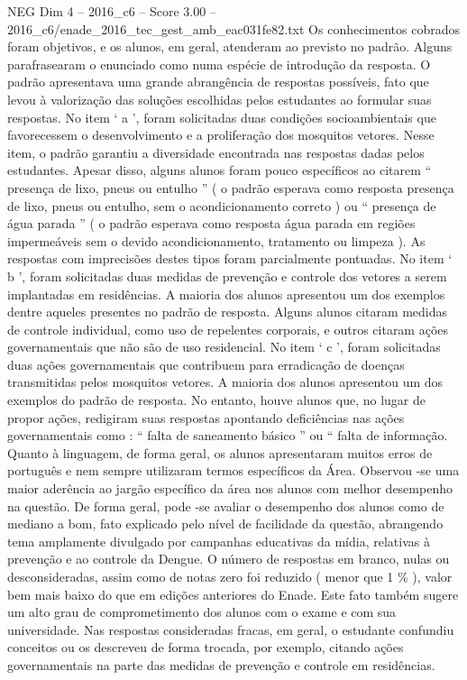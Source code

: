 \begin{textsample}{NEG Dim 4 – 2016\_c6 – Score 3.00 – 2016\_c6/enade\_2016\_tec\_gest\_amb\_eac031fe82.txt}
Os conhecimentos cobrados foram objetivos, e os alunos, em geral, atenderam ao previsto no padrão.
Alguns parafrasearam o enunciado como numa espécie de introdução da resposta.
O padrão apresentava uma grande abrangência de respostas possíveis, fato que levou à valorização das soluções escolhidas pelos estudantes ao formular suas respostas.
No item ‘ a ’, foram solicitadas duas condições socioambientais que favorecessem o desenvolvimento e a proliferação dos mosquitos vetores.
Nesse item, o padrão garantiu a diversidade encontrada nas respostas dadas pelos estudantes.
Apesar disso, alguns alunos foram pouco específicos ao citarem “ presença de lixo, pneus ou entulho ” ( o padrão esperava como resposta presença de lixo, pneus ou entulho, sem o acondicionamento correto ) ou “ presença de água parada ” ( o padrão esperava como resposta água parada em regiões impermeáveis sem o devido acondicionamento, tratamento ou limpeza ).
As respostas com imprecisões destes tipos foram parcialmente pontuadas.
No item ‘ b ’, foram solicitadas duas medidas de prevenção e controle dos vetores a serem implantadas em residências.
A maioria dos alunos apresentou um dos exemplos dentre aqueles presentes no padrão de resposta.
Alguns alunos citaram medidas de controle individual, como uso de repelentes corporais, e outros citaram ações governamentais que não são de uso residencial.
No item ‘ c ’, foram solicitadas duas ações governamentais que contribuem para erradicação de doenças transmitidas pelos mosquitos vetores.
A maioria dos alunos apresentou um dos exemplos do padrão de resposta.
No entanto, houve alunos que, no lugar de propor ações, redigiram suas respostas apontando deficiências nas ações governamentais como : “ falta de saneamento básico ” ou “ falta de informação.
Quanto à linguagem, de forma geral, os alunos apresentaram muitos erros de português e nem sempre utilizaram termos específicos da Área.
Observou -se uma maior aderência ao jargão específico da área nos alunos com melhor desempenho na questão.
De forma geral, pode -se avaliar o desempenho dos alunos como de mediano a bom, fato explicado pelo nível de facilidade da questão, abrangendo tema amplamente divulgado por campanhas educativas da mídia, relativas à prevenção e ao controle da Dengue.
O número de respostas em branco, nulas ou desconsideradas, assim como de notas zero foi reduzido ( menor que 1 \% ), valor bem mais baixo do que em edições anteriores do Enade.
Este fato também sugere um alto grau de comprometimento dos alunos com o exame e com sua universidade.
Nas respostas consideradas fracas, em geral, o estudante confundiu conceitos ou os descreveu de forma trocada, por exemplo, citando ações governamentais na parte das medidas de prevenção e controle em residências.

\end{textsample}
